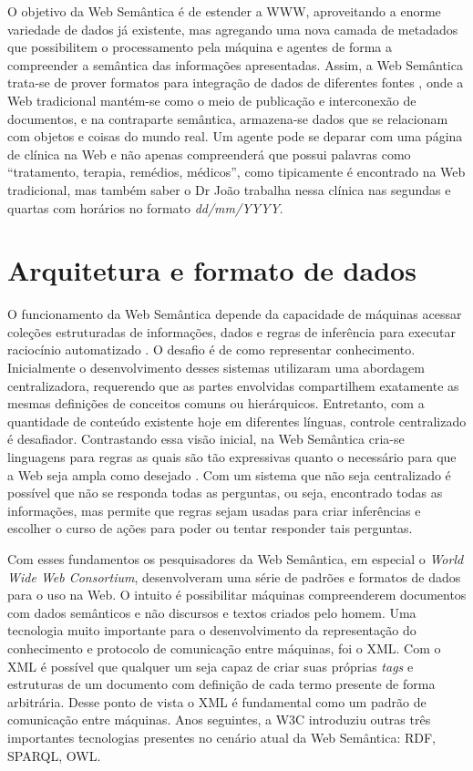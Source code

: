 O objetivo da Web Semântica é de estender a WWW, aproveitando a enorme variedade de dados já existente, mas agregando uma nova camada de metadados que possibilitem o processamento pela máquina e agentes de forma a compreender a semântica das informações apresentadas. Assim, a Web Semântica trata-se de prover formatos para integração de dados de diferentes fontes \citep{SemanticWebW3C}, onde a Web tradicional mantém-se como o meio de publicação e interconexão de documentos, e na contraparte semântica, armazena-se dados que se relacionam com objetos e coisas do mundo real. Um agente pode se deparar com uma página de clínica na Web e não apenas compreenderá que possui palavras como “tratamento, terapia, remédios, médicos”, como tipicamente é encontrado na Web tradicional, mas também saber o Dr João trabalha nessa clínica nas segundas e quartas com horários no formato \textit{dd/mm/YYYY}.

\section{Arquitetura e formato de dados}

O funcionamento da Web Semântica depende da capacidade de máquinas acessar coleções estruturadas de informações, dados e regras de inferência para executar raciocínio automatizado \citep{bernerslee2001semantic}. O desafio é de como representar conhecimento. Inicialmente o desenvolvimento desses sistemas utilizaram uma abordagem centralizadora, requerendo que as partes envolvidas compartilhem exatamente as mesmas definições de conceitos comuns ou hierárquicos. Entretanto, com a quantidade de conteúdo existente hoje em diferentes línguas, controle centralizado é desafiador. Contrastando essa visão inicial, na Web Semântica cria-se linguagens para regras as quais são tão expressivas quanto o necessário para que a Web seja ampla como desejado \citep{bernerslee2001semantic}. Com um sistema que não seja centralizado é possível que não se responda todas as perguntas, ou seja, encontrado todas as informações, mas permite que regras sejam usadas para criar inferências e escolher o curso de ações para poder ou tentar responder tais perguntas.

Com esses fundamentos os pesquisadores da Web Semântica, em especial o \textit{World Wide Web Consortium}, desenvolveram uma série de padrões e formatos de dados para o uso na Web. O intuito é possibilitar máquinas compreenderem documentos com dados semânticos e não discursos e textos criados pelo homem. Uma tecnologia muito importante para o desenvolvimento da representação do conhecimento e protocolo de comunicação entre máquinas, foi o XML. Com o XML é possível que qualquer um seja capaz de criar suas próprias \textit{tags} e estruturas de um documento com definição de cada termo presente de forma arbitrária. Desse ponto de vista o XML é fundamental como um padrão de comunicação entre máquinas. Anos seguintes, a W3C introduziu outras três importantes tecnologias presentes no cenário atual da Web Semântica: RDF, SPARQL, OWL.

